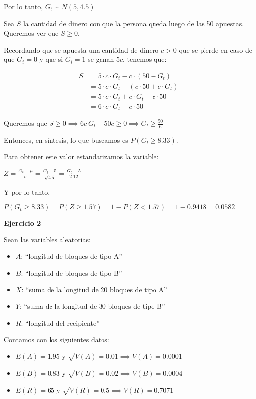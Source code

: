 \documentclass[11pt]{article}
\begin{document}
Por lo tanto, 
$ G_t \sim N(5,4.5)$

Sea $S$ la cantidad de dinero con que la persona queda luego de las 50 apuestas. Queremos ver que $S\geq 0$. 

Recordando que se apuesta una cantidad de dinero $c > 0$ que se pierde en caso de que $G_i=0$ y que si $G_i=1$ se ganan $5c$, tenemos que:

\begin{align*}
    S &= 5\cdot c \cdot G_t - c\cdot (50 - G_t) \\
      &= 5\cdot c \cdot G_t - (c \cdot 50 + c\cdot G_t) \\
      &= 5\cdot c \cdot G_t + c\cdot G_t - c\cdot 50 \\
      &= 6\cdot c \cdot G_t - c\cdot 50
\end{align*}

Queremos que $S \geq 0 \implies 6c \ G_t - 50c \geq 0 \implies G_t \geq \frac{50}{6}$  

Entonces, en s\'intesis, lo que buscamos es $P(G_t\geq 8.33)$. 

Para obtener este valor estandarizamos la variable:

$ Z = \frac{G_t - \mu}{\sigma} = \frac{G_t - 5}{\sqrt{4.5}} = \frac{G_t - 5}{2.12}$

Y por lo tanto,

$P(G_t\geq 8.33) = P(Z \geq 1.57) = 1 - P(Z < 1.57) = 1 - 0.9418 = 0.0582$


\textbf{Ejercicio 2}

Sean las variables aleatorias:
\begin{itemize}
    \item $A$: ``longitud de bloques de tipo A''
    \item $B$: ``longitud de bloques de tipo B''
    \item $X$: ``suma de la longitud de 20 bloques de tipo A''
    \item $Y$: ``suma de la longitud de 30 bloques de tipo B''
    \item $R$: ``longitud del recipiente''
\end{itemize}

Contamos con los siguientes datos:
\begin{itemize}
    \item $E(A) = 1.95$ y $\sqrt{V(A)} = 0.01 \implies V(A) = 0.0001$
    \item $E(B) = 0.83$ y $\sqrt{V(B)} = 0.02 \implies V(B) = 0.0004$
    \item $E(R) = 65$ y $\sqrt{V(R)} = 0.5 \implies V(R) = 0.7071$
\end{itemize}
\end{document}
